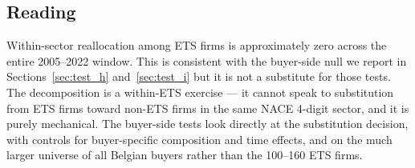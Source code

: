 \subsection{Reading}

Within-sector reallocation among ETS firms is approximately zero across the entire 2005--2022 window. This is consistent with the buyer-side null we report in Sections~\ref{sec:test_h} and~\ref{sec:test_i} but it is not a substitute for those tests. The decomposition is a within-ETS exercise --- it cannot speak to substitution from ETS firms toward non-ETS firms in the same NACE 4-digit sector, and it is purely mechanical. The buyer-side tests look directly at the substitution decision, with controls for buyer-specific composition and time effects, and on the much larger universe of all Belgian buyers rather than the 100--160 ETS firms.
